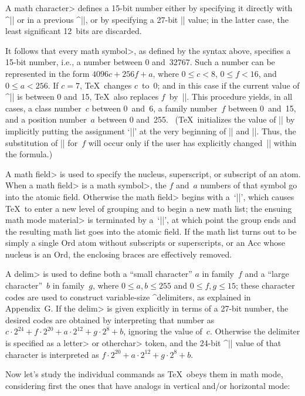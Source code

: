 A \<math character> defines a 15-bit number either by specifying it
directly with ^|\mathchar| or in a previous ^|\mathchardef|, or by
specifying a 27-bit |\delimiter| value; in the latter case, the least
significant 12~bits are discarded.

It follows that every \<math symbol>, as defined by the syntax above,
specifies a 15-bit number, i.e., a number between 0 and~32767.
Such a number can be represented in the form $4096c+256f+a$, where
$0\le c<8$, $0\le f<16$, and $0\le a<256$. If $c=7$, \TeX\ changes $c$~to~0;
and in this case if the current
value of\/ ^|\fam| is between 0 and~15, \TeX\ also replaces $f$~by~|\fam|.
This procedure yields, in all cases, a class number~$c$ between 0~and~6,
a family number~$f$ between 0~and~15, and a position number~$a$ between
0 and~255. \ (\TeX\ initializes the value of\/ |\fam| by implicitly
putting the assignment `||' at the very beginning of\/ |\everymath|
and |\everydisplay|. Thus, the substitution of\/ |\fam| for~$f$ will occur
only if the user has explicitly changed~|\fam| within the formula.)

A \<math field> is used to specify the nucleus, superscript, or subscript
of an atom. When a \<math field> is a \<math symbol>, the $f$ and~$a$
numbers of that symbol go into the atomic field. Otherwise the \<math field>
begins with a~`|{|', which causes \TeX\ to enter a new level
of grouping and to begin a new math list; the ensuing \<math mode material>
is terminated by a~`|}|', at which point the group ends and the resulting
math list goes into the atomic field. If the math list turns out to be
simply a single Ord atom without subscripts or superscripts,
or an Acc whose nucleus is an Ord, the
enclosing braces are effectively removed.

A \<delim> is used to define both a ``small character'' $a$ in family~$f$
and a ``large character''~$b$ in family~$g$, where $0\le a,b\le255$
and $0\le f,g\le15$; these character codes are used to construct variable-size
^{delimiters}, as explained in Appendix~G\null. If the \<delim> is given
explicitly in terms of a 27-bit number, the desired codes are obtained
by interpreting that number as
$c\cdot2^{24}+f\cdot2^{20}+a\cdot2^{12}+g\cdot2^8+b$, ignoring the value
of~$c$. Otherwise the delimiter is specified as a \<letter> or
\<otherchar> token, and the 24-bit ^|\delcode| value of that character is
interpreted as $f\cdot2^{20}+a\cdot2^{12}+g\cdot2^8+b$.

\smallskip
Now let's study the individual commands as \TeX\ obeys them in math mode,
considering first the ones that have analogs in vertical and/or horizontal
mode:

